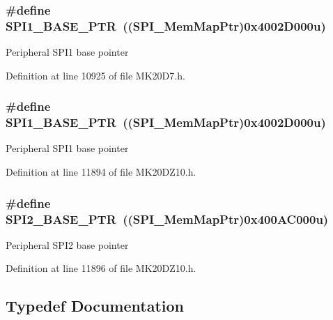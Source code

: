 \subsubsection[{\texorpdfstring{S\+P\+I1\+\_\+\+B\+A\+S\+E\+\_\+\+P\+TR}{SPI1_BASE_PTR}}]{\setlength{\rightskip}{0pt plus 5cm}\#define S\+P\+I1\+\_\+\+B\+A\+S\+E\+\_\+\+P\+TR~(({\bf S\+P\+I\+\_\+\+Mem\+Map\+Ptr})0x4002\+D000u)}\hypertarget{group___s_p_i___peripheral_gae28fd789e0602a32076c1c13ca39f5af}{}\label{group___s_p_i___peripheral_gae28fd789e0602a32076c1c13ca39f5af}
Peripheral S\+P\+I1 base pointer 

Definition at line 10925 of file M\+K20\+D7.\+h.

\subsubsection[{\texorpdfstring{S\+P\+I1\+\_\+\+B\+A\+S\+E\+\_\+\+P\+TR}{SPI1_BASE_PTR}}]{\setlength{\rightskip}{0pt plus 5cm}\#define S\+P\+I1\+\_\+\+B\+A\+S\+E\+\_\+\+P\+TR~(({\bf S\+P\+I\+\_\+\+Mem\+Map\+Ptr})0x4002\+D000u)}\hypertarget{group___s_p_i___peripheral_gae28fd789e0602a32076c1c13ca39f5af}{}\label{group___s_p_i___peripheral_gae28fd789e0602a32076c1c13ca39f5af}
Peripheral S\+P\+I1 base pointer 

Definition at line 11894 of file M\+K20\+D\+Z10.\+h.

\subsubsection[{\texorpdfstring{S\+P\+I2\+\_\+\+B\+A\+S\+E\+\_\+\+P\+TR}{SPI2_BASE_PTR}}]{\setlength{\rightskip}{0pt plus 5cm}\#define S\+P\+I2\+\_\+\+B\+A\+S\+E\+\_\+\+P\+TR~(({\bf S\+P\+I\+\_\+\+Mem\+Map\+Ptr})0x400\+A\+C000u)}\hypertarget{group___s_p_i___peripheral_ga78714a4b750aa56fc56d1d223a560069}{}\label{group___s_p_i___peripheral_ga78714a4b750aa56fc56d1d223a560069}
Peripheral S\+P\+I2 base pointer 

Definition at line 11896 of file M\+K20\+D\+Z10.\+h.



\subsection{Typedef Documentation}
